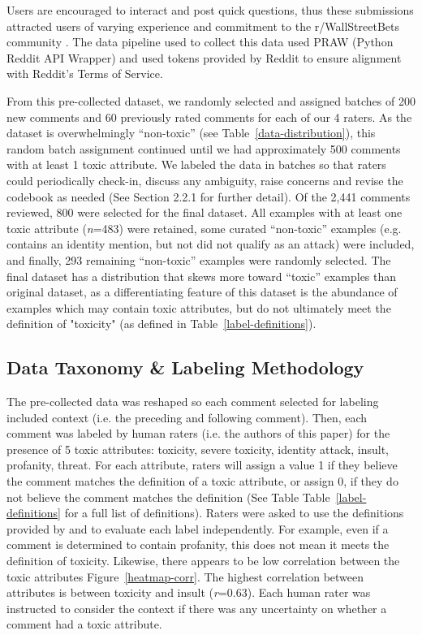 \documentclass[11pt]{article}
\begin{document}
Users are encouraged to interact and post quick questions, thus these submissions attracted users of varying experience and commitment to the r/WallStreetBets community \citep{wsb2022}. The data pipeline used to collect this data used PRAW (Python Reddit API Wrapper) and used tokens provided by Reddit to ensure alignment with Reddit's Terms of Service. 

From this pre-collected dataset, we randomly selected and assigned batches of 200 new comments and 60 previously rated comments for each of our 4 raters. As the dataset is overwhelmingly ``non-toxic'' (see Table~\ref{data-distribution}), this random batch assignment continued until we had approximately 500 comments with at least 1 toxic attribute. We labeled the data in batches so that raters could periodically check-in, discuss any ambiguity, raise concerns and revise the codebook as needed (See Section 2.2.1 for further detail). Of the 2,441 comments reviewed, 800 were selected for the final dataset. All examples with at least one toxic attribute (\emph{n}=483) were retained, some curated ``non-toxic'' examples (e.g. contains an identity mention, but not did not qualify as an attack) were included, and finally, 293 remaining ``non-toxic''  examples were randomly selected.  The final dataset has a distribution that skews more toward ``toxic'' examples than original dataset, as a differentiating feature of this dataset is the abundance of examples which may contain toxic attributes, but do not ultimately meet the definition of "toxicity" (as defined in Table~\ref{label-definitions}).


\subsection{Data Taxonomy \& Labeling Methodology}

The pre-collected data was reshaped so each comment selected for labeling included context (i.e. the preceding and following comment). Then, each comment was labeled by human raters (i.e. the authors of this paper) for the presence of 5 toxic attributes: toxicity, severe toxicity, identity attack, insult, profanity, threat. For each attribute, raters will assign a value 1 if they believe the comment matches the definition of a toxic attribute, or assign 0, if they do not believe the comment matches the definition (See Table Table~\ref{label-definitions} for a full list of definitions). Raters were asked to use the definitions provided by \citet{Perspective2022} and to evaluate each label independently. For example, even if a comment is determined to contain profanity, this does not mean it meets the definition of toxicity. Likewise, there appears to be low correlation between the toxic attributes Figure~\ref{heatmap-corr}. The highest correlation between attributes is between toxicity and insult (\emph{r}=0.63). Each human rater was instructed to consider the context if there was any uncertainty on whether a comment had a toxic attribute.
\end{document}
